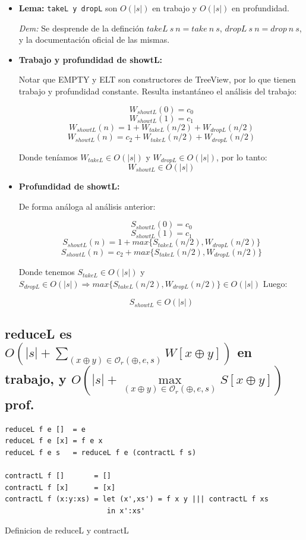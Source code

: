 \documentclass[12pt]{article}
\begin{document}
\begin{itemize}

\item \textbf{Lema:} \texttt{takeL y dropL} son $O(|s|)$ en trabajo y $O(|s|)$ en profundidad.

 \textit{Dem:} Se desprende de la definción $takeL\ s\ n = take\ n\ s$, $dropL\ s\ n = drop\ n\ s$, y la documentación oficial de las mismas. 

\item \textbf{Trabajo y profundidad de showtL:}

    Notar que EMPTY y ELT son constructores de TreeView, por lo que tienen trabajo y profundidad constante. Resulta instantáneo el análisis del trabajo: 

    $$ W_{showtL}(0) = c_0 $$
    $$ W_{showtL}(1) = c_1 $$
    $$ W_{showtL}(n) = 1 + W_{takeL}(n/2) + W_{dropL}(n/2)  $$
    $$ W_{showtL}(n) = c_2 + W_{takeL}(n/2) + W_{dropL}(n/2) $$

    Donde teníamos $W_{takeL} \in O(|s|)$ y $W_{dropL} \in O(|s|)$, por lo tanto:\\

    $$ W_{showtL} \in O(|s|) $$

\item \textbf{Profundidad de showtL:}
    
    De forma análoga al análisis anterior:

    $$ S_{showtL}(0) = c_0 $$
    $$ S_{showtL}(1) = c_1 $$
    $$ S_{showtL}(n) = 1 + max\{ S_{takeL}(n/2), W_{dropL}(n/2) \} $$
    $$ S_{showtL}(n) = c_2 + max\{ S_{takeL}(n/2), W_{dropL}(n/2) \} $$

    Donde tenemos $S_{takeL} \in O(|s|)$ y $S_{dropL} \in O(|s|) \Rightarrow max\{ S_{takeL}(n/2), W_{dropL}(n/2) \} \in O(|s|)$ Luego:

    $$ S_{showtL} \in O(|s|) $$
    
\end{itemize}


\subsection{reduceL es $O(|s| + \sum\limits_{(x\oplus y)\in\mathcal{O}_r(\oplus,e,s)} W[x\oplus y])$ en trabajo, y $O(|s| + \max\limits_{(x\oplus y)\in\mathcal{O}_r(\oplus,e,s)} S[x\oplus y])$ prof.}

\begin{table}[h]
\begin{lstlisting}
reduceL f e []  = e
reduceL f e [x] = f e x
reduceL f e s   = reduceL f e (contractL f s)

contractL f []       = []
contractL f [x]      = [x]
contractL f (x:y:xs) = let (x',xs') = f x y ||| contractL f xs 
                        in x':xs'
\end{lstlisting}
\caption{Definicion de reduceL y contractL}
\end{table}
\end{document}
